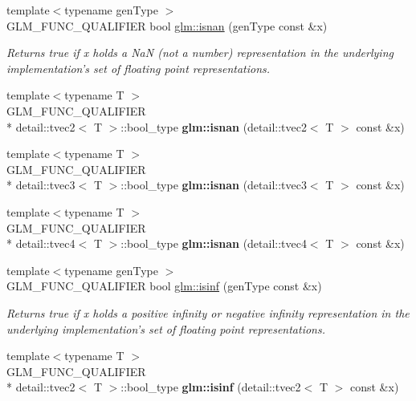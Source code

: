 \begin{DoxyCompactItemize}
\item 
{\footnotesize template$<$typename gen\-Type $>$ }\\G\-L\-M\-\_\-\-F\-U\-N\-C\-\_\-\-Q\-U\-A\-L\-I\-F\-I\-E\-R bool \hyperlink{group__core__func__common_ga5efda4205aed487be515b5f2921303f8}{glm\-::isnan} (gen\-Type const \&x)
\begin{DoxyCompactList}\small\item\em Returns true if x holds a Na\-N (not a number) representation in the underlying implementation's set of floating point representations. \end{DoxyCompactList}\item 
\hypertarget{namespaceglm_a267a9851957896d360a7b9168897390e}{{\footnotesize template$<$typename T $>$ }\\G\-L\-M\-\_\-\-F\-U\-N\-C\-\_\-\-Q\-U\-A\-L\-I\-F\-I\-E\-R \\*
detail\-::tvec2$<$ T $>$\-::bool\-\_\-type {\bfseries glm\-::isnan} (detail\-::tvec2$<$ T $>$ const \&x)}\label{namespaceglm_a267a9851957896d360a7b9168897390e}

\item 
\hypertarget{namespaceglm_a58c44d2114b8e0ab1a3b6669ad6b9c2d}{{\footnotesize template$<$typename T $>$ }\\G\-L\-M\-\_\-\-F\-U\-N\-C\-\_\-\-Q\-U\-A\-L\-I\-F\-I\-E\-R \\*
detail\-::tvec3$<$ T $>$\-::bool\-\_\-type {\bfseries glm\-::isnan} (detail\-::tvec3$<$ T $>$ const \&x)}\label{namespaceglm_a58c44d2114b8e0ab1a3b6669ad6b9c2d}

\item 
\hypertarget{namespaceglm_a5c8244b11b884f57c38b5ce1b8938842}{{\footnotesize template$<$typename T $>$ }\\G\-L\-M\-\_\-\-F\-U\-N\-C\-\_\-\-Q\-U\-A\-L\-I\-F\-I\-E\-R \\*
detail\-::tvec4$<$ T $>$\-::bool\-\_\-type {\bfseries glm\-::isnan} (detail\-::tvec4$<$ T $>$ const \&x)}\label{namespaceglm_a5c8244b11b884f57c38b5ce1b8938842}

\item 
{\footnotesize template$<$typename gen\-Type $>$ }\\G\-L\-M\-\_\-\-F\-U\-N\-C\-\_\-\-Q\-U\-A\-L\-I\-F\-I\-E\-R bool \hyperlink{group__core__func__common_ga69fcbd40e0ce359f832329c0c93d5912}{glm\-::isinf} (gen\-Type const \&x)
\begin{DoxyCompactList}\small\item\em Returns true if x holds a positive infinity or negative infinity representation in the underlying implementation's set of floating point representations. \end{DoxyCompactList}\item 
\hypertarget{namespaceglm_a12f7a78a9bcc77fdd8b542b11b149962}{{\footnotesize template$<$typename T $>$ }\\G\-L\-M\-\_\-\-F\-U\-N\-C\-\_\-\-Q\-U\-A\-L\-I\-F\-I\-E\-R \\*
detail\-::tvec2$<$ T $>$\-::bool\-\_\-type {\bfseries glm\-::isinf} (detail\-::tvec2$<$ T $>$ const \&x)}\label{namespaceglm_a12f7a78a9bcc77fdd8b542b11b149962}


\end{DoxyCompactItemize}
